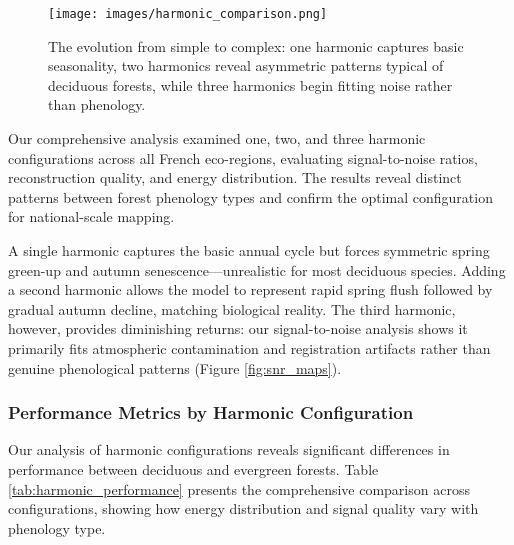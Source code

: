 \documentclass[utf8]{FrontiersinHarvard}
\begin{document}
\begin{figure}[H]
    \centering
    \texttt{[image: images/harmonic\_comparison.png]}
    \caption{The evolution from simple to complex: one harmonic captures basic seasonality, two harmonics reveal asymmetric patterns typical of deciduous forests, while three harmonics begin fitting noise rather than phenology.}
    \label{fig:harmonic_cmp}
\end{figure}

Our comprehensive analysis examined one, two, and three harmonic configurations across all French eco-regions, evaluating signal-to-noise ratios, reconstruction quality, and energy distribution. The results reveal distinct patterns between forest phenology types and confirm the optimal configuration for national-scale mapping.

A single harmonic captures the basic annual cycle but forces symmetric spring green-up and autumn senescence—unrealistic for most deciduous species. Adding a second harmonic allows the model to represent rapid spring flush followed by gradual autumn decline, matching biological reality. The third harmonic, however, provides diminishing returns: our signal-to-noise analysis shows it primarily fits atmospheric contamination and registration artifacts rather than genuine phenological patterns (Figure \ref{fig:snr_maps}).

\subsubsection{Performance Metrics by Harmonic Configuration}

Our analysis of harmonic configurations reveals significant differences in performance between deciduous and evergreen forests. Table \ref{tab:harmonic_performance} presents the comprehensive comparison across configurations, showing how energy distribution and signal quality vary with phenology type.
\end{document}
